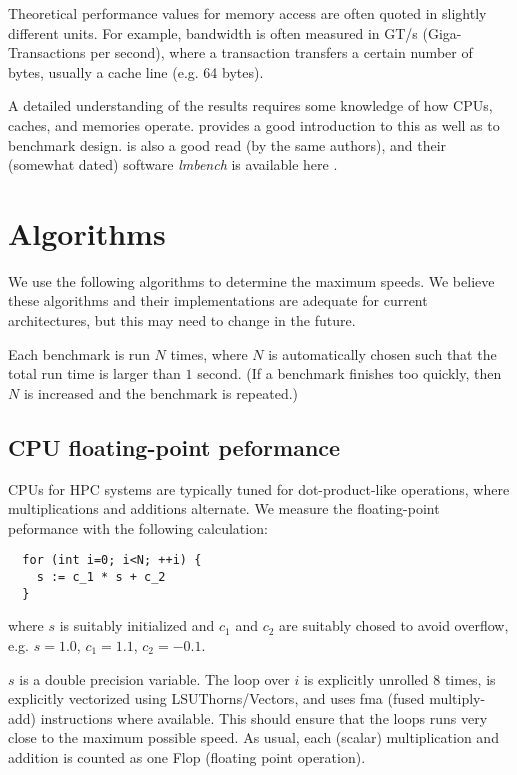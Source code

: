 Theoretical performance values for memory access are often quoted in
slightly different units. For example, bandwidth is often measured in
GT/s (Giga-Transactions per second), where a transaction transfers a
certain number of bytes, usually a cache line (e.g. 64 bytes).

A detailed understanding of the results requires some knowledge of how
CPUs, caches, and memories operate. \cite{lmbench-usenix} provides a
good introduction to this as well as to benchmark design.
\cite{mhz-usenix} is also a good read (by the same authors), and their
(somewhat dated) software \emph{lmbench} is available here
\cite{lmbench}.



\section{Algorithms}

We use the following algorithms to determine the maximum speeds. We
believe these algorithms and their implementations are adequate for
current architectures, but this may need to change in the future.

Each benchmark is run $N$ times, where $N$ is automatically chosen
such that the total run time is larger than $1$ second. (If a
benchmark finishes too quickly, then $N$ is increased and the
benchmark is repeated.)

\subsection{CPU floating-point peformance}
\label{sec:flop}

CPUs for HPC systems are typically tuned for dot-product-like
operations, where multiplications and additions alternate. We measure
the floating-point peformance with the following calculation:
\begin{verbatim}
  for (int i=0; i<N; ++i) {
    s := c_1 * s + c_2
  }
\end{verbatim}
where $s$ is suitably initialized and $c_1$ and $c_2$ are suitably
chosed to avoid overflow, e.g. $s=1.0$, $c_1=1.1$, $c_2=-0.1$.

$s$ is a double precision variable. The loop over $i$ is explicitly
unrolled $8$ times, is explicitly vectorized using LSUThorns/Vectors,
and uses fma (fused multiply-add) instructions where available. This
should ensure that the loops runs very close to the maximum possible
speed. As usual, each (scalar) multiplication and addition is counted
as one Flop (floating point operation).

